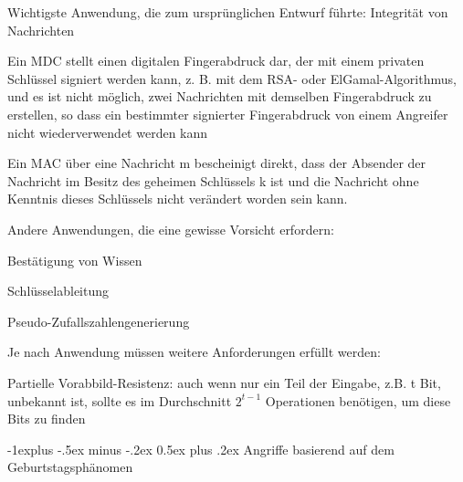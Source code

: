 \documentclass[a4paper]{article}
\makeatletter
\renewcommand{\subsection}{\@startsection{subsection}{2}{0mm}%
 {-1explus -.5ex minus -.2ex}%
 {0.5ex plus .2ex}%
 {\normalfont\normalsize\bfseries}}
\makeatother
\begin{document}
\begin{multicols}{3}
      \begin{itemize*}
            \item Wichtigste Anwendung, die zum ursprünglichen Entwurf führte:
            Integrität von Nachrichten
            \begin{itemize*}
                  \item Ein MDC stellt einen digitalen Fingerabdruck dar, der mit einem privaten Schlüssel signiert werden kann, z. B. mit dem RSA- oder ElGamal-Algorithmus, und es ist nicht möglich, zwei Nachrichten mit demselben Fingerabdruck zu erstellen, so dass ein bestimmter signierter Fingerabdruck von einem Angreifer nicht wiederverwendet werden kann
                  \item Ein MAC über eine Nachricht m bescheinigt direkt, dass der Absender der Nachricht im Besitz des geheimen Schlüssels k ist und die Nachricht ohne Kenntnis dieses Schlüssels nicht verändert worden sein kann.
            \end{itemize*}
            \item Andere Anwendungen, die eine gewisse Vorsicht erfordern:
            \begin{itemize*}
                  \item Bestätigung von Wissen
                  \item Schlüsselableitung
                  \item Pseudo-Zufallszahlengenerierung
            \end{itemize*}
            \item Je nach Anwendung müssen weitere Anforderungen erfüllt werden:
            \begin{itemize*}
                  \item Partielle Vorabbild-Resistenz: auch wenn nur ein Teil der Eingabe, z.B. t Bit, unbekannt ist, sollte es im Durchschnitt $2^{t-1}$ Operationen benötigen, um diese Bits zu finden
            \end{itemize*}
      \end{itemize*}


      \subsection{Angriffe basierend auf dem
            Geburtstagsphänomen}


\end{multicols}
\end{document}
